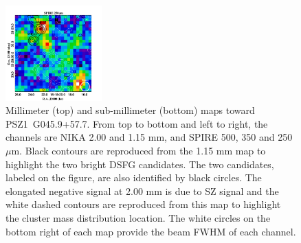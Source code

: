\documentclass[11pt,a4paper,twoside,graphicx,color]{article}
\begin{document}
\begin{figure}[h!]
	\includegraphics[width=0.33\textwidth]{MultiL_PSZ1G045_250.pdf}
	\caption{\footnotesize{Millimeter (top) and sub-millimeter (bottom) maps toward \mbox{PSZ1~G045.9+57.7}. From top to bottom and left to right, the channels are NIKA 2.00 and 1.15 mm, and SPIRE 500, 350 and 250 $\mu$m. Black contours are reproduced from the 1.15 mm map to highlight the two bright DSFG candidates. The two candidates, labeled on the figure, are also identified by black circles. The elongated negative signal at 2.00 mm is due to SZ signal \citep{Ruppin2016} and the white dashed contours are reproduced from this map to highlight the cluster mass distribution location. The white circles on the bottom right of each map provide the beam FWHM of each channel.}}
	\label{fig:maps} 
\end{figure}
\end{document}
